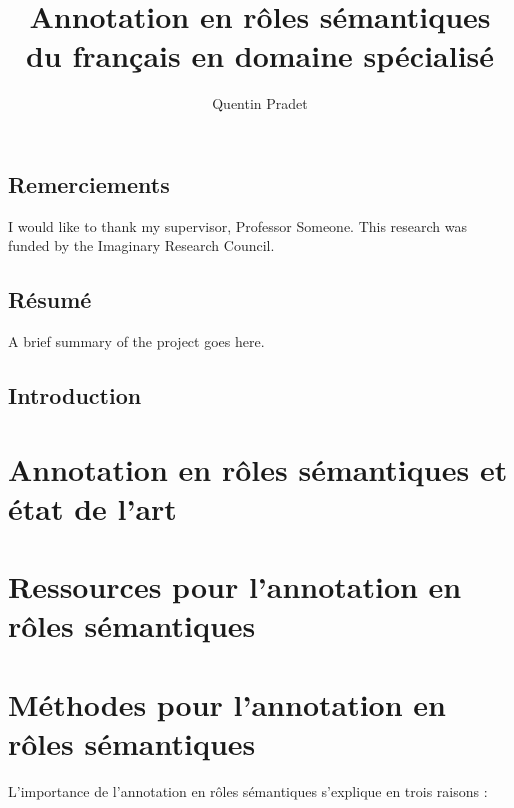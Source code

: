 \documentclass[oneside,parskip]{scrbook}
\title{Annotation en rôles sémantiques \\ du français en domaine spécialisé}
\author{Quentin Pradet}
\date{}
\begin{document}
\maketitle

\frontmatter
\tableofcontents
\listoffigures
\listoftables

\chapter{Remerciements}

I would like to thank my supervisor, Professor Someone. This
research was funded by the Imaginary Research Council.

\chapter{Résumé}

A brief summary of the project goes here.


\mainmatter

\chapter{Introduction}
\label{ch:intro}

\part{Annotation en rôles sémantiques et état de l'art}





\part{Ressources pour l'annotation en rôles sémantiques}





\part{Méthodes pour l'annotation en rôles sémantiques}

L'importance de l'annotation en rôles sémantiques s'explique en trois raisons :
\end{document}
